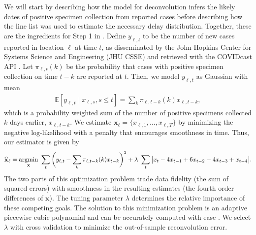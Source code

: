 We will start by describing how the model for deconvolution infers the likely
dates of positive specimen collection from reported cases before describing how
the line list was used to estimate the necessary delay distribution. Together,
these are the ingredients for Step 1 in .
Define $y_{\ell,t}$ to be the number of new cases reported in location $\ell$ at
time $t$, as disseminated by the John Hopkins Center for Systems Science and
Engineering (JHU CSSE)\citealp{dong2020interactive} and retrieved with the
COVIDcast API \citep{reinhart2021open}. Let $\pi_{\ell,t}(k)$ be the probability
that cases with positive specimen collection on time $t-k$ are reported at $t$. Then, we
model $y_{\ell,t}$ as Gaussian with mean 
\begin{align}
  \label{eq:cases-model}
  \mathbb{E}[y_{\ell,t} \mid x_{\ell,s}, s \leq t ] =\sum_{k} \pi_{\ell,t-k}(k)x_{\ell,t-k},
\end{align}
which is a probability weighted sum of the number of positive specimens
collected $k$ days earlier, $x_{\ell,t-k}$.
We estimate $\mathbf{x}_\ell = \{x_{\ell,1},\ldots,x_{\ell,T}\}$ by minimizing
the negative log-likelihood with a penalty that encourages smoothness in time.
Thus, our estimator is given by
\begin{align}
  \label{eq:cases-deconvolved}
  \widehat{\mathbf{x}}_\ell = \operatorname*{argmin}_{\mathbf{x}}\ \sum_{t}
  \bigg( y_{\ell,t} -  \sum_k \pi_{\ell,t-k}(k) x_{t-k} \bigg)^2 
  + \lambda\ \sum_t \big|x_t - 4x_{t-1} + 6x_{t-2} -4x_{t-3}+ x_{t-4}\big|.
\end{align}
The two parts of this optimization problem trade data fidelity (the sum of
squared errors) with smoothness in the resulting estimates (the fourth order
differences of $\mathbf{x}$). The tuning parameter $\lambda$ determines the
relative importance of these competing goals. The solution to this minimization
problem is an adaptive piecewise cubic polynomial \citep{tibshirani2014adaptive,
tibshirani2022divided} and can be accurately computed with ease
\citep{ramdas2016fast,jahja2022real}. We select $\lambda$ with cross validation
to minimize the out-of-sample reconvolution error. 


